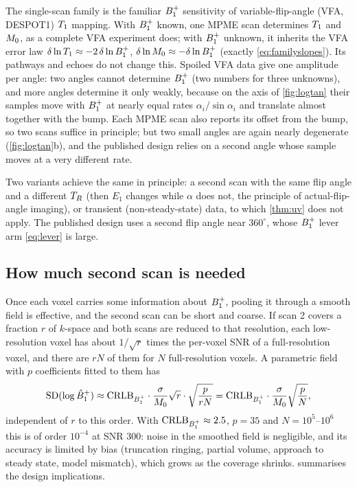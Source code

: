 The single-scan family is the familiar $B_1^{+}$ sensitivity of variable-flip-angle (VFA, DESPOT1)
$T_1$ mapping. With $B_1^{+}$ known, one MPME scan determines $T_1$ and $M_0$, as a complete VFA
experiment does; with $B_1^{+}$ unknown, it inherits the VFA error law $\delta\ln T_1\approx-2\,\delta\ln B_1^{+}$,
$\delta\ln M_0\approx-\delta\ln B_1^{+}$ (exactly \eqref{eq:familyslopes}). Its pathways and echoes do not change this.
Spoiled VFA data give one amplitude per angle: two angles cannot determine $B_1^{+}$ (two numbers
for three unknowns), and more angles determine it only weakly, because on the axis of
\cref{fig:logtan} their samples move with $B_1^{+}$ at nearly equal rates $\alpha_i/\sin\alpha_i$ and
translate almost together with the bump. Each MPME scan also reports its offset from the
bump, so two scans suffice in principle; but two small angles are again nearly degenerate
(\cref{fig:logtan}b), and the published design relies on a second angle whose sample moves at
a very different rate.

Two variants achieve the same in principle: a second scan with the same flip angle and a
different $T_R$ (then $E_1$ changes while $\alpha$ does not, the principle of actual-flip-angle imaging),
or transient (non-steady-state) data, to which \cref{thm:uv} does not apply. The published
design uses a second flip angle near $360^\circ$, whose $B_1^{+}$ lever arm \eqref{eq:lever} is large.

\subsection{How much second scan is needed}\label{sec:design}

Once each voxel carries some information about $B_1^{+}$, pooling it through a smooth field is
effective, and the second scan can be short and coarse. If scan 2 covers a fraction $r$ of
$k$-space and both scans are reduced to that resolution, each low-resolution voxel has about
$1/\sqrt r$ times the per-voxel SNR of a full-resolution voxel, and there are $rN$ of them for $N$
full-resolution voxels. A parametric field with $p$ coefficients fitted to them has
\begin{equation}
  \mathrm{SD}(\log\hat B_1^{+})\approx\mathrm{CRLB}_{B_1^{+}}\cdot\frac{\sigma}{M_0}\sqrt r\cdot\sqrt{\frac{p}{rN}}
  =\mathrm{CRLB}_{B_1^{+}}\cdot\frac{\sigma}{M_0}\sqrt{\frac pN},
  \label{eq:smoothsd}
\end{equation}
independent of $r$ to this order. With $\mathrm{CRLB}_{B_1^{+}}\approx2.5$, $p=35$ and $N=10^5$--$10^6$ this is of
order $10^{-4}$ at SNR 300: noise in the smoothed field is negligible, and its accuracy is limited
by bias (truncation ringing, partial volume, approach to steady state, model mismatch), which
grows as the coverage shrinks.  summarises the design implications.

